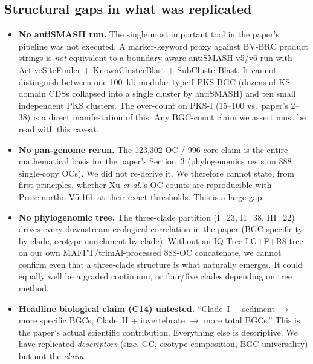 \documentclass[11pt,letterpaper]{article}
\begin{document}
\subsection{Structural gaps in what was replicated}
\begin{itemize}
\item \textbf{No antiSMASH run.} The single most important tool in the paper's pipeline was not executed. A marker-keyword proxy against BV-BRC product strings is \emph{not} equivalent to a boundary-aware antiSMASH v5/v6 run with ActiveSiteFinder + KnownClusterBlast + SubClusterBlast. It cannot distinguish between one 100~kb modular type-I PKS BGC (dozens of KS-domain CDSs collapsed into a single cluster by antiSMASH) and ten small independent PKS clusters. The over-count on PKS-I (15--100 vs.\ paper's 2--38) is a direct manifestation of this. Any BGC-count claim we assert must be read with this caveat.
\item \textbf{No pan-genome rerun.} The 123{,}302 OC / 996 core claim is the entire mathematical basis for the paper's Section~3 (phylogenomics rests on 888 single-copy OCs). We did not re-derive it. We therefore cannot state, from first principles, whether Xu \textit{et al.}'s OC counts are reproducible with Proteinortho V5.16b at their exact thresholds. This is a large gap.
\item \textbf{No phylogenomic tree.} The three-clade partition (I=23, II=38, III=22) drives every downstream ecological correlation in the paper (BGC specificity by clade, ecotype enrichment by clade). Without an IQ-Tree LG+F+R8 tree on our own MAFFT/trimAl-processed 888-OC concatenate, we cannot confirm even that a three-clade structure is what naturally emerges. It could equally well be a graded continuum, or four/five clades depending on tree method.
\item \textbf{Headline biological claim (C14) untested.} ``Clade~I + sediment $\rightarrow$ more specific BGCs; Clade~II + invertebrate $\rightarrow$ more total BGCs.'' This is the paper's actual scientific contribution. Everything else is descriptive. We have replicated \emph{descriptors} (size, GC, ecotype composition, BGC universality) but not the \emph{claim}.
\end{itemize}
\end{document}

